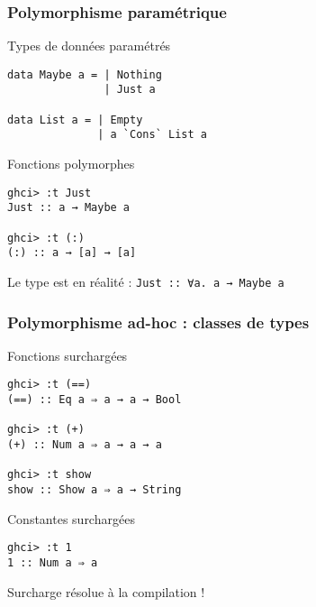 \documentclass[10pt]{beamer}
\begin{document}
\begin{frame}[fragile]
\frametitle{Polymorphisme paramétrique}
\begin{block}
{Types de données paramétrés}
\begin{verbatim}
data Maybe a = | Nothing
               | Just a

data List a = | Empty
              | a `Cons` List a
\end{verbatim}
\end{block}
\begin{block}
{Fonctions polymorphes}
\begin{verbatim}
ghci> :t Just
Just :: a → Maybe a

ghci> :t (:)
(:) :: a → [a] → [a]
\end{verbatim}
\end{block}
Le type est en réalité : \verb|Just :: ∀a. a → Maybe a|
\end{frame}



\begin{frame}[fragile]
\frametitle{Polymorphisme ad-hoc : classes de types}
\begin{block}
{Fonctions surchargées}
\begin{verbatim}
ghci> :t (==)
(==) :: Eq a ⇒ a → a → Bool

ghci> :t (+)
(+) :: Num a ⇒ a → a → a

ghci> :t show
show :: Show a ⇒ a → String
\end{verbatim}
\end{block}
\begin{block}
{Constantes surchargées}
\begin{verbatim}
ghci> :t 1
1 :: Num a ⇒ a
\end{verbatim}
\end{block}
Surcharge résolue à la compilation !
\end{frame}
\end{document}

